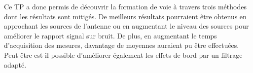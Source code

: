 \documentclass[a4paper]{article}
\begin{document}
Ce TP a donc permis de découvrir la formation de voie à travers trois méthodes dont les résultats sont mitigés. De meilleurs résultats pourraient être obtenus en approchant les sources de l'antenne ou en augmentant le niveau des sources pour améliorer le rapport signal sur bruit. De plus, en augmentant le temps d'acquisition des mesures, davantage de moyennes auraient pu être effectuées.\\

Peut être est-il possible d'améliorer également les effets de bord par un filtrage adapté.\\





\newpage
\addtolength{\oddsidemargin}{-1cm}
\addtolength{\textheight}{2cm}
\renewcommand{\headsep}{-1cm}
\addtolength{\footskip}{3cm}

\end{document}
